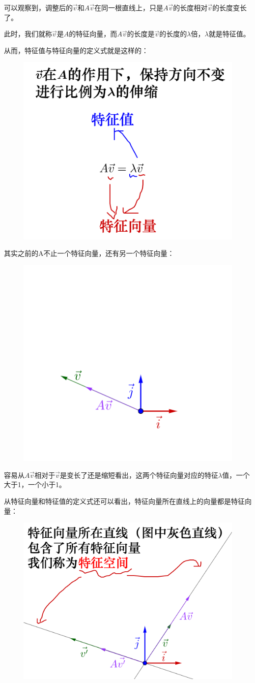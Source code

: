 \documentclass[12pt]{article}
\begin{document}
可以观察到，调整后的$\vec{v_{}}$和$A\vec{v_{}}$在同一根直线上，只是$A\vec{v_{}}$的长度相对$\vec{v_{}}$的长度变长了。

此时，我们就称$\vec{v_{}}$是$A$的特征向量，而$A\vec{v_{}}$的长度是$\vec{v_{}}$的长度的$\lambda$倍，$\lambda$就是特征值。

从而，特征值与特征向量的定义式就是这样的：

\begin{figure}[H]
    \centering
    \includegraphics[width=.5\textwidth]{fig/UnderstandEigenValueVector_4.png}
\end{figure} 

其实之前的A不止一个特征向量，还有另一个特征向量：
\begin{figure}[H]
    \centering
    \includegraphics[width=.3\textwidth]{fig/UnderstandEigenValueVector_5.png}
\end{figure} 

容易从$A\vec{v_{}}$相对于$\vec{v_{}}$是变长了还是缩短看出，这两个特征向量对应的特征$\lambda$值，一个大于1，一个小于1。

从特征向量和特征值的定义式还可以看出，特征向量所在直线上的向量都是特征向量：
\begin{figure}[H]
    \centering
    \includegraphics[width=.3\textwidth]{fig/UnderstandEigenValueVector_6.png}
\end{figure} 
\end{document}
